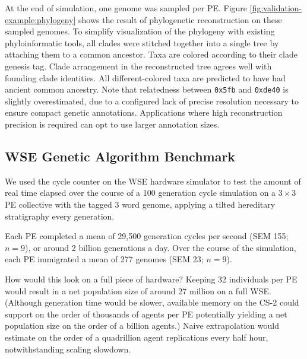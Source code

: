 At the end of simulation, one genome was sampled per PE.
Figure \ref{fig:validation-example:phylogeny} shows the result of phylogenetic reconstruction on these sampled genomes.
To simplify visualization of the phylogeny with existing phyloinformatic tools, all clades were stitched together into a single tree by attaching them to a common ancestor.
Taxa are colored according to their clade genesis tag.
Clade arrangement in the reconstructed tree agrees well with founding clade identities.
All different-colored taxa are predicted to have had ancient common ancestry.
Note that relatedness between \texttt{0x5fb} and \texttt{0xde40} is slightly overestimated, due to a configured lack of precise resolution necessary to ensure compact genetic annotations.
Applications where high reconstruction precision is required can opt to use larger annotation sizes.


\subsection{WSE Genetic Algorithm Benchmark}

We used the cycle counter on the WSE hardware simulator to test the amount of real time elapsed over the course of a 100 generation cycle simulation on a $3\times3$ PE collective with the tagged 3 word genome, applying a tilted hereditary stratigraphy every generation.

Each PE completed a mean of 29,500 generation cycles per second (SEM 155; $n=9$), or around 2 billion generations a day.
Over the course of the simulation, each PE immigrated a mean of 277 genomes (SEM 23; $n=9$).

How would this look on a full piece of hardware?
Keeping 32 individuals per PE would result in a net population size of around 27 million on a full WSE.
(Although generation time would be slower, available memory on the CS-2 could support on the order of thousands of agents per PE potentially yielding a net population size on the order of a billion agents.)
Naive extrapolation would estimate on the order of a quadrillion agent replications every half hour, notwithstanding scaling slowdown.


